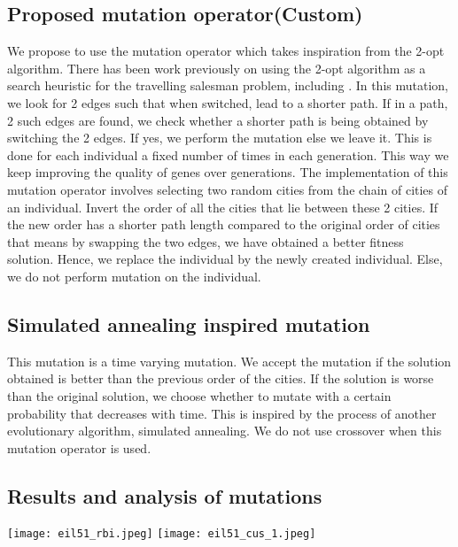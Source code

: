 \documentclass{article}
\begin{document}
\subsection{Proposed mutation operator(Custom)}
We propose to use the mutation operator which takes inspiration from the 2-opt algorithm. There has been work previously on using the 2-opt algorithm as a search heuristic for the travelling salesman problem, including \cite{karagul2016using}. In this mutation, we look for 2 edges such that when switched, lead to a shorter path. If in a path, 2 such edges are found, we check whether a shorter path is being obtained by switching the 2 edges. If yes, we perform the mutation else we leave it. This is done for each individual a fixed number of times in each generation. This way we keep improving the quality of genes over generations.
The implementation of this mutation operator involves selecting two random cities from the chain of cities of an individual. Invert the order of all the cities that lie between these 2 cities. If the new order has a shorter path length compared to the original order of cities that means by swapping the two edges, we have obtained a better fitness solution. Hence, we replace the individual by the newly created individual. Else, we do not perform mutation on the individual.

\subsection{Simulated annealing inspired mutation}
This mutation is a time varying mutation. We accept the mutation if the solution obtained is better than the previous order of the cities. If the solution is worse than the original solution, we choose whether to mutate with a certain probability that decreases with time. This is inspired by the process of another evolutionary algorithm, simulated annealing. We do not use crossover when this mutation operator is used. 

\subsection{Results and analysis of mutations}

\begin{minipage}{6in}
  \centering
  \texttt{[image: eil51\_rbi.jpeg]}
  \hspace*{.2in}
  \texttt{[image: eil51\_cus\_1.jpeg]}
\end{minipage}
\end{document}
